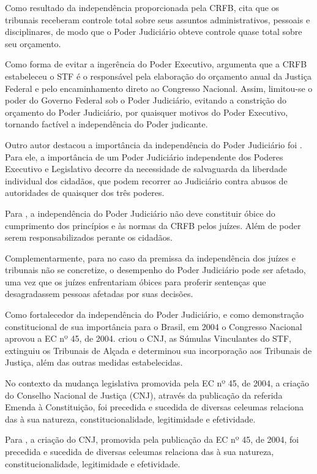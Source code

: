 Como resultado da independência proporcionada pela CRFB, \cite{pires2021paradoxo} cita que os tribunais receberam controle total sobre seus assuntos administrativos, pessoais e disciplinares, de modo que o Poder Judiciário obteve controle quase total sobre seu orçamento.

Como forma de evitar a ingerência do Poder Executivo, \cite{pires2021paradoxo} argumenta que a CRFB estabeleceu o STF é o responsável pela elaboração do orçamento anual da Justiça Federal e pelo encaminhamento direto ao Congresso Nacional. Assim, limitou-se o poder do Governo Federal sob o Poder Judiciário, evitando a constrição do orçamento do Poder Judiciário, por quaisquer motivos do Poder Executivo, tornando factível a independência do Poder judicante.

Outro autor destacou a importância da independência do Poder Judiciário foi \cite{akutsu2012dimensoes}. Para ele, a importância de um Poder Judiciário independente dos Poderes Executivo e Legislativo decorre da necessidade de salvaguarda da liberdade individual dos cidadãos, que podem recorrer ao Judiciário contra abusos de autoridades de quaisquer dos três poderes. 

Para \cite{akutsu2012dimensoes}, a independência do Poder Judiciário não deve constituir óbice do cumprimento dos princípios e às normas da CRFB pelos juízes. Além de poder serem responsabilizados perante os cidadãos. 

Complementarmente, para \cite{akutsu2012dimensoes} no caso da premissa da independência dos juízes e tribunais não se concretize, o desempenho do Poder Judiciário pode ser afetado, uma vez que os juízes enfrentariam óbices para  proferir sentenças que desagradassem pessoas afetadas por suas decisões.

Como fortalecedor da independência do Poder Judiciário, e como demonstração constitucional de sua importância para o Brasil, em 2004 o Congresso Nacional aprovou a EC nº 45, de 2004. \cite{ec45_2004} criou o CNJ, as Súmulas Vinculantes do STF, extinguiu os Tribunais de Alçada e determinou sua incorporação aos Tribunais de Justiça, além das outras medidas estabelecidas.

No contexto da mudança legislativa promovida pela  EC nº 45, de 2004, a criação do Conselho Nacional de Justiça (CNJ), através da publicação da referida Emenda à Constituição, foi precedida e sucedida de diversas celeumas relaciona das à sua natureza, constitucionalidade, legitimidade e efetividade.

Para \cite{silva2013transparencia}, a criação do CNJ, promovida pela publicação da EC nº 45, de 2004, foi precedida e sucedida de diversas celeumas relaciona das à sua natureza, constitucionalidade, legitimidade e efetividade.  


